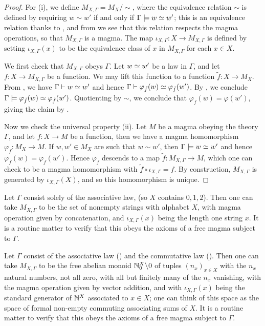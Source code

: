 \begin{proof}\leanok
  For (i), we define $M_{X,\Gamma} = M_X / \sim$, where the equivalence relation $\sim$ is defined by requiring $w \sim w'$ if and only if $\Gamma \models w \simeq w'$; this is an equivalence relation thanks to , and from  we see that this relation respects the magma operations, so that $M_{X,\Gamma}$ is a magma. The map $\iota_{X,\Gamma}: X \to M_{X,\Gamma}$ is defined by setting $\iota_{X,\Gamma}(x)$ to be the equivalence class of $x$ in $M_{X,\Gamma}$ for each $x \in X$.

  We first check that $M_{X,\Gamma}$ obeys $\Gamma$. Let $w \simeq w'$ be a law in $\Gamma$, and let $f: X \to M_{X,\Gamma}$ be a function. We may lift this function to a function $\tilde{f}: X \to M_X$. From , we have $\Gamma \vdash w \simeq w'$ and hence $\Gamma \vdash \varphi_{\tilde{f}}(w) \simeq \varphi_{\tilde{f}}(w')$. By , we conclude $\Gamma \models \varphi_{\tilde{f}}(w) \simeq \varphi_{\tilde{f}}(w')$. Quotienting by $\sim$, we conclude that $\varphi_f(w) = \varphi(w')$, giving the claim by .

  Now we check the universal property (ii). Let $M$ be a magma obeying the theory $\Gamma$, and let $f: X \to M$ be a function, then we have a magma homomorphism $\varphi_f: M_X \to M$. If $w, w' \in M_X$ are such that $w \sim w'$, then $\Gamma \models w \simeq w'$ and hence $\varphi_f(w) = \varphi_f(w')$. Hence $\varphi_f$ descends to a map $\tilde{f}: M_{X,\Gamma} \to M$, which one can check to be a magma homomorphism with $\tilde{f} \circ \iota_{X,\Gamma} = f$. By construction, $M_{X,\Gamma}$ is generated by $\iota_{X,\Gamma}(X)$, and so this homomorphism is unique.
\end{proof}

\begin{example}
  Let $\Gamma$ consist solely of the associative law,  (so $X$ contains $0,1,2$). Then one can take $M_{X,\Gamma}$ to be the set of nonempty strings with alphabet $X$, with magma operation given by concatenation, and $\iota_{X,\Gamma}(x)$ being the length one string $x$. It is a routine matter to verify that this obeys the axioms of a free magma subject to $\Gamma$.
\end{example}

\begin{example}\label{facm}
  Let $\Gamma$ consist of the associative law () and the commutative law (). Then one can take $M_{X,\Gamma}$ to be the free abelian monoid $\mathbb{N}_0^X \backslash 0$ of tuples $(n_x)_{x \in X}$ with the $n_x$ natural numbers, not all zero, with all but finitely many of the $n_x$ vanishing, with the magma operation given by vector addition, and with $\iota_{X,\Gamma}(x)$ being the standard generator of $\mathbb{N}^X$ associated to $x \in X$; one can think of this space as the space of formal non-empty commuting associating sums of $X$. It is a routine matter to verify that this obeys the axioms of a free magma subject to $\Gamma$.
\end{example}

